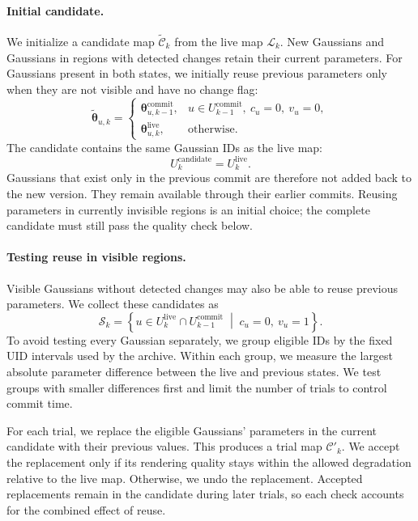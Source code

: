 \paragraph{Initial candidate.}
We initialize a candidate map $\widetilde{\mathcal{C}}_k$
from the live map $\mathcal{L}_k$.
New Gaussians and Gaussians in regions with detected changes retain
their current parameters.
For Gaussians present in both states, we initially reuse previous
parameters only when they are not visible and have no change flag:
\begin{equation}
    \widetilde{\boldsymbol{\theta}}_{u,k}
    =
    \begin{cases}
        \boldsymbol{\theta}_{u,k-1}^{\mathrm{commit}},
        & u \in U_{k-1}^{\mathrm{commit}},\
          c_u=0,\ v_u=0,\\[2pt]
        \boldsymbol{\theta}_{u,k}^{\mathrm{live}},
        & \text{otherwise}.
    \end{cases}
    \label{eq:initial_version}
\end{equation}
The candidate contains the same Gaussian IDs as the live map:
\begin{equation}
    U_k^{\mathrm{candidate}} = U_k^{\mathrm{live}}.
\end{equation}
Gaussians that exist only in the previous commit are therefore not
added back to the new version.
They remain available through their earlier commits.
Reusing parameters in currently invisible regions is an initial
choice; the complete candidate must still pass the quality check below.

\paragraph{Testing reuse in visible regions.}
Visible Gaussians without detected changes may also be able to reuse
previous parameters.
We collect these candidates as
\begin{equation}
    \mathcal{S}_k =
    \left\{
        u \in
        U_k^{\mathrm{live}} \cap U_{k-1}^{\mathrm{commit}}
        \;\middle|\;
        c_u=0,\ v_u=1
    \right\}.
\end{equation}
To avoid testing every Gaussian separately, we group eligible IDs
by the fixed UID intervals used by the archive.
Within each group, we measure the largest absolute parameter difference
between the live and previous states.
We test groups with smaller differences first and limit the number
of trials to control commit time.

For each trial, we replace the eligible Gaussians' parameters in
the current candidate with their previous values.
This produces a trial map $\mathcal{C}'_k$.
We accept the replacement only if its rendering quality stays within
the allowed degradation relative to the live map.
Otherwise, we undo the replacement.
Accepted replacements remain in the candidate during later trials,
so each check accounts for the combined effect of reuse.

